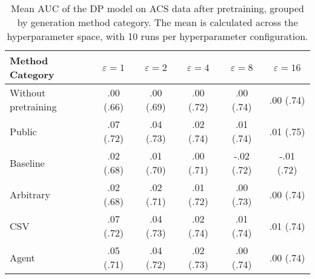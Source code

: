 \begin{table}[h!]
    \centering
    \caption{Mean AUC of the DP model on ACS data after pretraining, grouped by generation method category. The mean is calculated across the hyperparameter space, with 10 runs per hyperparameter configuration.}
    \label{tab:epsilon_comparison}
    \begin{tabular}{lccccc}
    \toprule
    Method Category & $\varepsilon=1$ & $\varepsilon=2$ & $\varepsilon=4$ & $\varepsilon=8$ & $\varepsilon=16$ \\
    \midrule
    Without pretraining & .00 {\small (.66)} & .00 {\small (.69)} & .00 {\small (.72)} & .00 {\small (.74)} & .00 {\small (.74)} \\
    \arrayrulecolor{black!50!}\midrule
    Public & \cellcolor{silver!30}.07 {\small (.72)} & \cellcolor{gold!30}.04 {\small (.73)} & \cellcolor{gold!30}.02 {\small (.74)} & \cellcolor{gold!30}.01 {\small (.74)} & \cellcolor{gold!30}.01 {\small (.75)} \\
    \arrayrulecolor{black!50!}\midrule
    Baseline & .02 {\small (.68)} & .01 {\small (.70)} & .00 {\small (.71)} & -.02 {\small (.72)} & -.01 {\small (.72)} \\
    \arrayrulecolor{black!50!}\midrule
    Arbitrary & .02 {\small (.68)} & \cellcolor{bronze!30}.02 {\small (.71)} & .01 {\small (.72)} & .00 {\small (.73)} & .00 {\small (.74)} \\
    \arrayrulecolor{black!50!}\midrule
    CSV & \cellcolor{gold!30}.07 {\small (.72)} & \cellcolor{gold!30}.04 {\small (.73)} & \cellcolor{silver!30}.02 {\small (.74)} & \cellcolor{silver!30}.01 {\small (.74)} & \cellcolor{silver!30}.01 {\small (.74)} \\
    Agent & \cellcolor{bronze!30}.05 {\small (.71)} & \cellcolor{silver!30}.04 {\small (.72)} & \cellcolor{bronze!30}.02 {\small (.73)} & \cellcolor{bronze!30}.00 {\small (.74)} & \cellcolor{bronze!30}.00 {\small (.74)} \\
    \bottomrule
    \end{tabular}
\end{table}